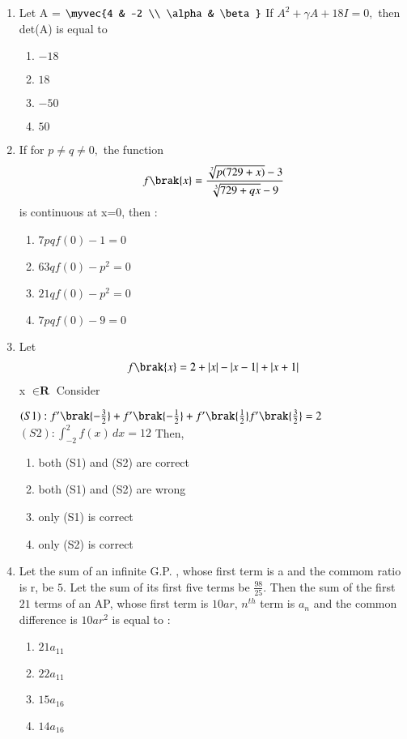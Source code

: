 \documentclass[journal]{IEEEtran}
\begin{document}
\begin{enumerate}
     \item Let A = $\myvec{4 & -2 \\ \alpha & \beta}$ If $A^2 + \gamma A + 18I = 0,$ then det(A) is equal to 
     
     \begin{enumerate}
         \item $-18$ 
         \item $18$ 
         \item $-50$ 
         \item $50$     
     \end{enumerate}


     \item If for $p \neq q \neq 0,$ the function 
     \begin{align*}
         f\brak{x} =\frac{\sqrt[7]{p(729 + x)}-3}{\sqrt[3]{729 +qx} -9}  
     \end{align*} 
     is continuous at x=0, then :
     \begin{enumerate}
         \item $7pqf(0)- 1 =0$
         \item $63qf(0)- p^2 =0$
         \item $21qf(0) - p^2 =0$
         \item $7pqf(0)-9 = 0$
     \end{enumerate}


     \item Let
     \begin{align*}
        f\brak{x} =2 + |x| - |x-1| + |x+1| 
     \end{align*} 
     x $\in \textbf{R} $ Consider
     
         $(S1): f^\prime\brak{-{\frac{3}{2}}} + f^\prime\brak{-{\frac{1}{2}}} + f^\prime\brak{{\frac{1}{2}}} f^\prime\brak{{\frac{3}{2}}} = 2$\\
     $(S2) : \int_{-2}^2 f(x) \, dx = 12$ Then,
     \begin{enumerate}
         \item both (S1) and (S2) are correct 
         \item both (S1) and (S2) are wrong 
         \item only (S1) is correct 
        \item only (S2) is correct 
     \end{enumerate}


     \item Let the sum of an infinite G.P. , whose first term is a and the commom ratio is r, be $5$. Let the sum of its first five terms be $\frac{98}{25}.$ Then the sum of the first $21$ terms of an AP, whose first term is $10ar$, $n^{th}$ term is $a_n$ and the common difference is $10ar^{2}$ is equal to :
     \begin{enumerate}
         \item $21a_{11}$
         \item $22a_{11}$
         \item $15a_{16}$
         \item $14 a_{16}$
    \end{enumerate}



\end{enumerate}
\end{document}
